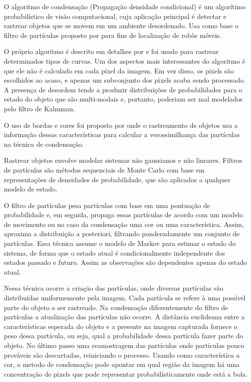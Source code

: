 O algoritmo de condensação (Propagação densidade condicional) é um algorítimo probabilístico de visão computacional, cuja aplicação principal é detectar e rastrear objetos que se movem em um ambiente desordenado. Usa como base o filtro de partículas proposto por  para fins de localização de robôs móveis.

O próprio algoritmo é descrito em detalhes por  e foi usado para rastrear determinados tipos de curvas. Um dos aspectos mais interessantes do algoritmo é que ele não é calculado em cada pixel da imagem. Em vez disso, os pixels são escolhidos ao acaso, e apenas um subconjunto dos pixels acaba sendo processado. A presença de desordem tende a produzir distribuições de probabilidades para o estado do objeto que são multi-modais e, portanto, poderiam ser mal modelados pelo filtro de Kalmman.

O uso de bordas e cores foi proposto por  onde o rastreamento de objetos usa a informação dessas características para calcular a verossimilhança das partículas na técnica de condensação. 

Rastrear objetos envolve modelar sistemas não gaussianos e não lineares. Filtros de partículas são métodos sequenciais de Monte Carlo com base em representações de densidades de probabilidade, que são aplicados a qualquer modelo de estado.

O filtro de partículas pesa partículas com base em uma pontuação de probabilidade e, em seguida, propaga essas partículas de acordo com um modelo de movimento ou no caso da condensação uma cor ou uma característica. Assim, aproxima a distribuição a posteriori, filtrando ponderadamente um conjunto de partículas. Essa técnica assume o modelo de Markov para estimar o estado do sistema, de forma que o estado atual é condicionalmente independente dos estados passado e futuro. Assim as observações são dependentes apenas do estado atual.

Nessa técnica ocorre a criação das partículas, onde diversas partículas são distribuídas uniformemente pela imagem. Cada partícula se refere à uma possível parte do objeto a ser rastreado. Na condensação diferentemente do filtro de partículas a atualização das partículas não ocorre. A distância euclideana entre a características esperada do objeto e a presente na imagem capturada fornece o peso dessa partícula, ou seja, qual  a probabilidade dessa partícula fazer parte do objeto. No último passo uma reamostragem das partículas onde partículas pouco prováveis são descartadas, reiniciando o processo. Usando como característica a cor, o metodo de condensação pode apontar em qual região da imagem há uma concentração de pixels que pode representar probabilísticamente onde está a bola.



